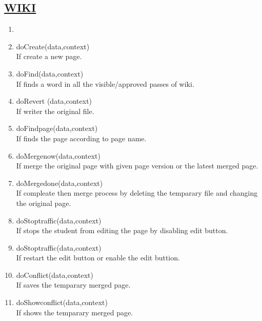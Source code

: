 \documentclass{article}
\begin{document}
\subsection*{\underline{WIKI}}
\begin{enumerate}
\item[{}{}]
\item doCreate(data,context)\\
If create a new page.
\item doFind(data,context)\\
If finds a word in all the visible/approved passes of wiki.  
\item doRevert (data,context)\\
If writer the original file.
\item doFindpage(data,context)\\
If finds the page according to page name.
\item doMergenow(data,context)\\
If merge the original page with given page version or the latest merged page.
\item doMergedone(data,context)\\
If compleate then merge process by deleting the temparary file and changing the original page.
\item doStoptraffic(data,context)\\
If stops the student from editing the page by disabling edit button.
\item doStoptraffic(data,context)\\
If restart the edit button or enable the edit buttion.
\item doConflict(data,context)\\
If saves the temparary merged page.
\item doShowconflict(data,context)\\
If shows the temparary merged page.
\end{enumerate}
\end{document}
